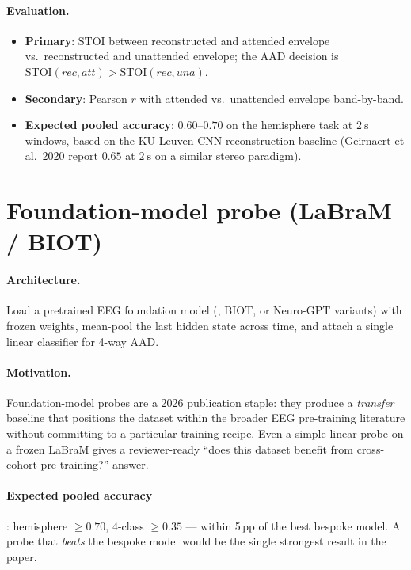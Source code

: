 \paragraph{Evaluation.}
\begin{itemize}
  \item \textbf{Primary}: STOI between reconstructed and attended
        envelope vs.\ reconstructed and unattended envelope; the AAD
        decision is $\text{STOI}(rec, att) > \text{STOI}(rec, una)$.
  \item \textbf{Secondary}: Pearson $r$ with attended vs.\ unattended
        envelope band-by-band.
  \item \textbf{Expected pooled accuracy}: $0.60$--$0.70$ on the
        hemisphere task at $\SI{2}{\second}$ windows, based on the
        KU Leuven CNN-reconstruction baseline (Geirnaert et al.\ 2020
        report $0.65$ at $\SI{2}{\second}$ on a similar stereo paradigm).
\end{itemize}

\section{Foundation-model probe (LaBraM / BIOT)}

\paragraph{Architecture.} Load a pretrained EEG foundation model
(, BIOT, or Neuro-GPT variants) with frozen
weights, mean-pool the last hidden state across time, and attach a
single linear classifier for 4-way AAD.

\paragraph{Motivation.} Foundation-model probes are a 2026 publication
staple: they produce a \emph{transfer} baseline that positions the
dataset within the broader EEG pre-training literature without
committing to a particular training recipe. Even a simple linear
probe on a frozen LaBraM gives a reviewer-ready ``does this dataset
benefit from cross-cohort pre-training?'' answer.

\paragraph{Expected pooled accuracy}: hemisphere $\geq 0.70$, 4-class
$\geq 0.35$ — within 5\,pp of the best bespoke model. A probe that
\emph{beats} the bespoke model would be the single strongest result
in the paper.

